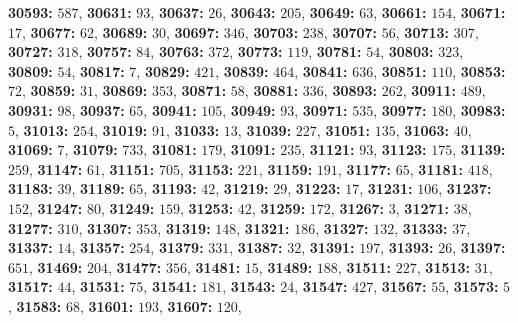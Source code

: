 \textsf{\bfseries 30593:} $587$, \textsf{\bfseries 30631:} $93$, \textsf{\bfseries 30637:} $26$, \textsf{\bfseries 30643:} $205$, \textsf{\bfseries 30649:} $63$, \textsf{\bfseries 30661:} $154$, \textsf{\bfseries 30671:} $17$, \textsf{\bfseries 30677:} $62$, \textsf{\bfseries 30689:} $30$, \textsf{\bfseries 30697:} $346$, \textsf{\bfseries 30703:} $238$, \textsf{\bfseries 30707:} $56$, \textsf{\bfseries 30713:} $307$, \textsf{\bfseries 30727:} $318$, \textsf{\bfseries 30757:} $84$, \textsf{\bfseries 30763:} $372$, \textsf{\bfseries 30773:} $119$, \textsf{\bfseries 30781:} $54$, \textsf{\bfseries 30803:} $323$, \textsf{\bfseries 30809:} $54$, \textsf{\bfseries 30817:} $7$, \textsf{\bfseries 30829:} $421$, \textsf{\bfseries 30839:} $464$, \textsf{\bfseries 30841:} $636$, \textsf{\bfseries 30851:} $110$, \textsf{\bfseries 30853:} $72$, \textsf{\bfseries 30859:} $31$, \textsf{\bfseries 30869:} $353$, \textsf{\bfseries 30871:} $58$, \textsf{\bfseries 30881:} $336$, \textsf{\bfseries 30893:} $262$, \textsf{\bfseries 30911:} $489$, \textsf{\bfseries 30931:} $98$, \textsf{\bfseries 30937:} $65$, \textsf{\bfseries 30941:} $105$, \textsf{\bfseries 30949:} $93$, \textsf{\bfseries 30971:} $535$, \textsf{\bfseries 30977:} $180$, \textsf{\bfseries 30983:} $5$, \textsf{\bfseries 31013:} $254$, \textsf{\bfseries 31019:} $91$, \textsf{\bfseries 31033:} $13$, \textsf{\bfseries 31039:} $227$, \textsf{\bfseries 31051:} $135$, \textsf{\bfseries 31063:} $40$, \textsf{\bfseries 31069:} $7$, \textsf{\bfseries 31079:} $733$, \textsf{\bfseries 31081:} $179$, \textsf{\bfseries 31091:} $235$, \textsf{\bfseries 31121:} $93$, \textsf{\bfseries 31123:} $175$, \textsf{\bfseries 31139:} $259$, \textsf{\bfseries 31147:} $61$, \textsf{\bfseries 31151:} $705$, \textsf{\bfseries 31153:} $221$, \textsf{\bfseries 31159:} $191$, \textsf{\bfseries 31177:} $65$, \textsf{\bfseries 31181:} $418$, \textsf{\bfseries 31183:} $39$, \textsf{\bfseries 31189:} $65$, \textsf{\bfseries 31193:} $42$, \textsf{\bfseries 31219:} $29$, \textsf{\bfseries 31223:} $17$, \textsf{\bfseries 31231:} $106$, \textsf{\bfseries 31237:} $152$, \textsf{\bfseries 31247:} $80$, \textsf{\bfseries 31249:} $159$, \textsf{\bfseries 31253:} $42$, \textsf{\bfseries 31259:} $172$, \textsf{\bfseries 31267:} $3$, \textsf{\bfseries 31271:} $38$, \textsf{\bfseries 31277:} $310$, \textsf{\bfseries 31307:} $353$, \textsf{\bfseries 31319:} $148$, \textsf{\bfseries 31321:} $186$, \textsf{\bfseries 31327:} $132$, \textsf{\bfseries 31333:} $37$, \textsf{\bfseries 31337:} $14$, \textsf{\bfseries 31357:} $254$, \textsf{\bfseries 31379:} $331$, \textsf{\bfseries 31387:} $32$, \textsf{\bfseries 31391:} $197$, \textsf{\bfseries 31393:} $26$, \textsf{\bfseries 31397:} $651$, \textsf{\bfseries 31469:} $204$, \textsf{\bfseries 31477:} $356$, \textsf{\bfseries 31481:} $15$, \textsf{\bfseries 31489:} $188$, \textsf{\bfseries 31511:} $227$, \textsf{\bfseries 31513:} $31$, \textsf{\bfseries 31517:} $44$, \textsf{\bfseries 31531:} $75$, \textsf{\bfseries 31541:} $181$, \textsf{\bfseries 31543:} $24$, \textsf{\bfseries 31547:} $427$, \textsf{\bfseries 31567:} $55$, \textsf{\bfseries 31573:} $5$, \textsf{\bfseries 31583:} $68$, \textsf{\bfseries 31601:} $193$, \textsf{\bfseries 31607:} $120$, 
